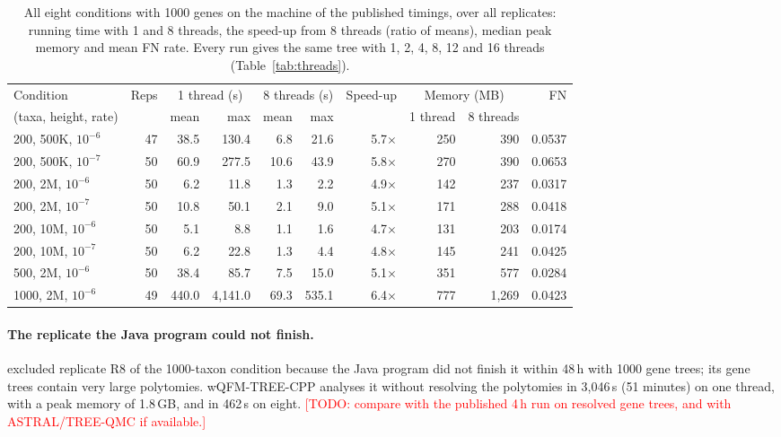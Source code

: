 \documentclass[11pt,a4paper]{article}
\newcommand{\todo}[1]{\textcolor{red}{[TODO: #1]}}
\newcommand{\cpp}{wQFM-TREE-CPP}
\begin{document}
\begin{table}[t]
\centering\small
\caption{All eight conditions with 1000 genes on the machine of the published timings, over all
replicates: running time with 1 and 8 threads, the speed-up from 8 threads (ratio of means), median
peak memory and mean FN rate. Every run gives the same tree with 1, 2, 4, 8, 12 and 16 threads
(Table~\ref{tab:threads}).}
\label{tab:accuracy1000}
\footnotesize\setlength{\tabcolsep}{4pt}
\begin{tabular}{lrrrrrrrrr}
\toprule
Condition & Reps & \multicolumn{2}{c}{1 thread (s)} & \multicolumn{2}{c}{8 threads (s)} & Speed-up & \multicolumn{2}{c}{Memory (MB)} & FN \\
\cmidrule(lr){3-4}\cmidrule(lr){5-6}\cmidrule(lr){8-9}
(taxa, height, rate) & & mean & max & mean & max & & 1 thread & 8 threads & \\
\midrule
200, 500K, $10^{-6}$ & 47 & 38.5  & 130.4   & 6.8  & 21.6  & 5.7$\times$ & 250 & 390   & 0.0537 \\
200, 500K, $10^{-7}$ & 50 & 60.9  & 277.5   & 10.6 & 43.9  & 5.8$\times$ & 270 & 390   & 0.0653 \\
200, 2M, $10^{-6}$   & 50 & 6.2   & 11.8    & 1.3  & 2.2   & 4.9$\times$ & 142 & 237   & 0.0317 \\
200, 2M, $10^{-7}$   & 50 & 10.8  & 50.1    & 2.1  & 9.0   & 5.1$\times$ & 171 & 288   & 0.0418 \\
200, 10M, $10^{-6}$  & 50 & 5.1   & 8.8     & 1.1  & 1.6   & 4.7$\times$ & 131 & 203   & 0.0174 \\
200, 10M, $10^{-7}$  & 50 & 6.2   & 22.8    & 1.3  & 4.4   & 4.8$\times$ & 145 & 241   & 0.0425 \\
500, 2M, $10^{-6}$   & 50 & 38.4  & 85.7    & 7.5  & 15.0  & 5.1$\times$ & 351 & 577   & 0.0284 \\
1000, 2M, $10^{-6}$  & 49 & 440.0 & 4{,}141.0 & 69.3 & 535.1 & 6.4$\times$ & 777 & 1{,}269 & 0.0423 \\
\bottomrule
\end{tabular}
\end{table}

\paragraph{The replicate the Java program could not finish.} \citet{rafi2025wqfmtree} excluded
replicate R8 of the 1000-taxon condition because the Java program did not finish it within 48\,h with
1000 gene trees; its gene trees contain very large polytomies. \cpp{} analyses it without resolving the
polytomies in 3{,}046\,s (51 minutes) on one thread, with a peak memory of 1.8\,GB, and in 462\,s on
eight. \todo{compare with the published 4\,h run on resolved gene trees, and with ASTRAL/TREE-QMC if
available.}
\end{document}
